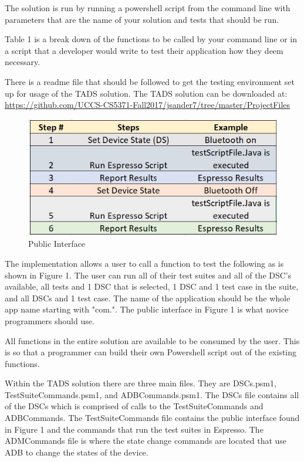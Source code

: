 The solution is run by running a powershell script from the command line with parameters that are the name of your solution and tests that should be run.

Table 1 is a break down of the functions to be called by your command line or in a script that a developer would write to test their application how they deem necessary.  

There is a readme file that should be followed to get the testing environment set up for usage of the TADS solution.  The TADS solution can be downloaded at: \url{https://github.com/UCCS-CS5371-Fall2017/jsander7/tree/master/ProjectFiles} \\

\begin{figure}[t]
	\centering
	\caption[Public Interface]{Public Interface}
	\label{fig:table1}
	\includegraphics[width=1\linewidth]{table1}
\end{figure}

The implementation allows a user to call a function to test the following as is shown in Figure 1.  The user can run all of their test suites and all of the DSC's available, all tests and 1 DSC that is selected, 1 DSC and 1 test case in the suite, and all DSCs and 1 test case. The name of the application should be the whole app name starting with "com.". The public interface in Figure 1 is what novice programmers should use.   

All functions in the entire solution are available to be consumed by the user.  This is so that a programmer can build their own Powershell script out of the existing functions.  

Within the TADS solution there are three main files.  They are DSCs.psm1, TestSuiteCommands.psm1, and ADBCommands.psm1.  The DSCs file contains all of the DSCs which is comprised of calls to the TestSuiteCommands and ADBCommands.  The TestSuiteCommands file contains the public interface found in Figure 1 and the commands that run the test suites in Espresso.  The ADMCommands file is where the state change commands are located that use ADB to change the states of the device. 

